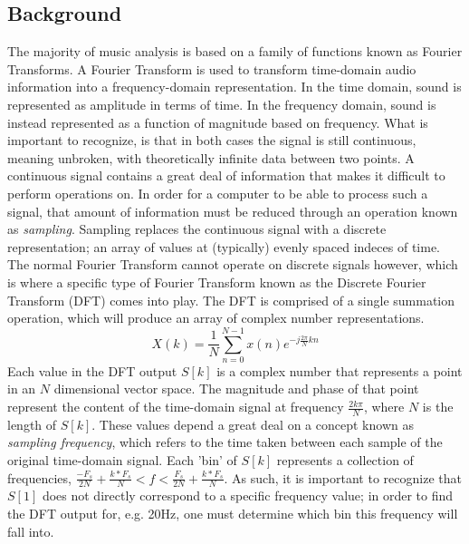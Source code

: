 \documentclass[conference]{IEEEtran}
\begin{document}
\subsection{Background}
The majority of music analysis is based on a family of functions known as Fourier Transforms. A Fourier Transform is used to transform time-domain audio information into a frequency-domain representation. In the time domain, sound is represented as amplitude in terms of time. In the frequency domain, sound is instead represented as a function of magnitude based on frequency. What is important to recognize, is that in both cases the signal is still continuous, meaning unbroken, with theoretically infinite data between two points. A continuous signal contains a great deal of information that makes it difficult to perform operations on. In order for a computer to be able to process such a signal, that amount of information must be reduced through an operation known as \textit{sampling}. Sampling replaces the continuous signal with a discrete representation; an array of values at (typically) evenly spaced indeces of time. The normal Fourier Transform cannot operate on discrete signals however, which is where a specific type of Fourier Transform known as the Discrete Fourier Transform (DFT) comes into play. The DFT is comprised of a single summation operation, which will produce an array of complex number representations.
\begin{equation}
  X(k)=\frac{1}{N}\sum_{n=0}^{N-1}x(n)e^{-j\frac{2\pi}{N}kn}\label{DFT}
\end{equation}
Each value in the DFT output $S[k]$ is a complex number that represents a point in an $N$ dimensional vector space. The magnitude and phase of that point represent the content of the time-domain signal at frequency $\frac{2k\pi}{N}$, where $N$ is the length of $S[k]$. These values depend a great deal on a concept known as \textit{sampling frequency}, which refers to the time taken between each sample of the original time-domain signal. Each 'bin' of $S[k]$ represents a collection of frequencies, $\frac{-F_{s}}{2N} + \frac{k*F_{s}}{N} < f < \frac{F_{s}}{2N} + \frac{k*F_{s}}{N}$. As such, it is important to recognize that $S[1]$ does not directly correspond to a specific frequency value; in order to find the DFT output for, e.g. 20Hz, one must determine which bin this frequency will fall into.
\end{document}
